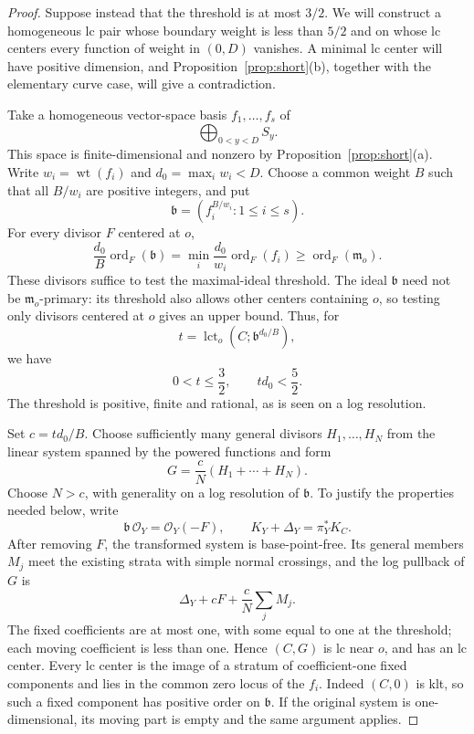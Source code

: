\documentclass[11pt]{article}
\theoremstyle{definition}
\theoremstyle{remark}
\numberwithin{equation}{section}
\newcommand{\m}{\mathfrak m}
\newcommand{\wt}{\operatorname{wt}}
\newcommand{\ord}{\operatorname{ord}}
\newcommand{\lct}{\operatorname{lct}}
\newcommand{\cO}{\mathcal O}
\begin{document}
\begin{proof}
Suppose instead that the threshold is at most \(3/2\). We will construct a homogeneous lc pair whose boundary weight is less than \(5/2\) and on whose lc centers every function of weight in \((0,D)\) vanishes. A minimal lc center will have positive dimension, and Proposition~\ref{prop:short}(b), together with the elementary curve case, will give a contradiction.

Take a homogeneous vector-space basis \(f_1,\ldots,f_s\) of
\[
\bigoplus_{0<y<D}S_y.
\]
This space is finite-dimensional and nonzero by Proposition~\ref{prop:short}(a). Write \(w_i=\wt(f_i)\) and \(d_0=\max_iw_i<D\). Choose a common weight \(B\) such that all \(B/w_i\) are positive integers, and put
\[
\mathfrak b=(f_i^{B/w_i}:1\le i\le s).
\]
For every divisor \(F\) centered at \(o\),
\[
\frac{d_0}{B}\ord_F(\mathfrak b)
=\min_i\frac{d_0}{w_i}\ord_F(f_i)
\ge\ord_F(\m_o).
\]
These divisors suffice to test the maximal-ideal threshold. The ideal \(\mathfrak b\) need not be \(\m_o\)-primary: its threshold also allows other centers containing \(o\), so testing only divisors centered at \(o\) gives an upper bound. Thus, for
\[
t=\lct_o(C;\mathfrak b^{d_0/B}),
\]
we have
\begin{equation}\label{eq:threshold-numerics}
0<t\le\frac32,\qquad td_0<\frac52.
\end{equation}
The threshold is positive, finite and rational, as is seen on a log resolution.

Set \(c=td_0/B\). Choose sufficiently many general divisors \(H_1,\ldots,H_N\) from the linear system spanned by the powered functions and form
\[
G=\frac cN(H_1+\cdots+H_N).
\]
Choose \(N>c\), with generality on a log resolution of \(\mathfrak b\). To justify the properties needed below, write
\[
\mathfrak b\,\cO_Y=\cO_Y(-F),\qquad
K_Y+\Delta_Y=\pi_Y^*K_C.
\]
After removing \(F\), the transformed system is base-point-free. Its general members \(M_j\) meet the existing strata with simple normal crossings, and the log pullback of \(G\) is
\[
\Delta_Y+cF+\frac cN\sum_jM_j.
\]
The fixed coefficients are at most one, with some equal to one at the threshold; each moving coefficient is less than one. Hence \((C,G)\) is lc near \(o\), and has an lc center. Every lc center is the image of a stratum of coefficient-one fixed components and lies in the common zero locus of the \(f_i\). Indeed \((C,0)\) is klt, so such a fixed component has positive order on \(\mathfrak b\). If the original system is one-dimensional, its moving part is empty and the same argument applies.


\end{proof}
\end{document}
